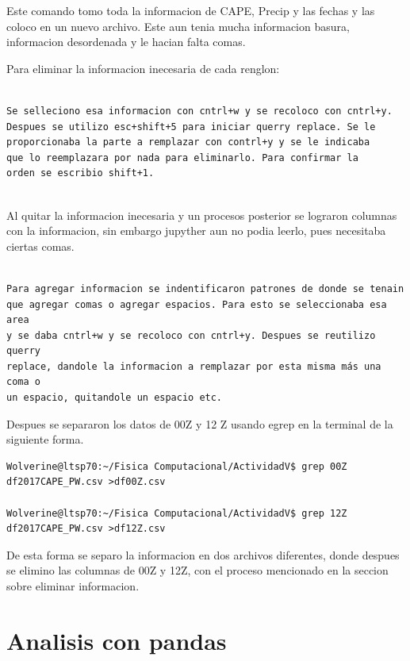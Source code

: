 \documentclass[a4paper]{article}
\begin{document}
Este comando tomo toda la informacion de CAPE, Precip y las fechas y las coloco en un nuevo archivo. Este aun tenia mucha informacion basura, informacion desordenada y le hacian falta comas.

Para eliminar la informacion inecesaria de cada renglon:


\begin{verbatim}

Se selleciono esa informacion con cntrl+w y se recoloco con cntrl+y. 
Despues se utilizo esc+shift+5 para iniciar querry replace. Se le 
proporcionaba la parte a remplazar con contrl+y y se le indicaba 
que lo reemplazara por nada para eliminarlo. Para confirmar la 
orden se escribio shift+1.


\end{verbatim}

Al quitar la informacion inecesaria y un procesos posterior se lograron columnas con la informacion, sin embargo jupyther aun no podia leerlo, pues necesitaba ciertas comas.

\begin{verbatim}

Para agregar informacion se indentificaron patrones de donde se tenain
que agregar comas o agregar espacios. Para esto se seleccionaba esa area
y se daba cntrl+w y se recoloco con cntrl+y. Despues se reutilizo querry
replace, dandole la informacion a remplazar por esta misma más una coma o
un espacio, quitandole un espacio etc.

\end{verbatim}

Despues se separaron los datos de 00Z y 12 Z usando egrep en la terminal de la siguiente forma.

\begin{verbatim}
Wolverine@ltsp70:~/Fisica Computacional/ActividadV$ grep 00Z df2017CAPE_PW.csv >df00Z.csv

Wolverine@ltsp70:~/Fisica Computacional/ActividadV$ grep 12Z df2017CAPE_PW.csv >df12Z.csv

\end{verbatim}

De esta forma se separo la informacion en dos archivos diferentes, donde despues se elimino las columnas de 00Z y 12Z, con el proceso mencionado en la seccion sobre eliminar informacion. 

\section{Analisis con pandas}
\end{document}
